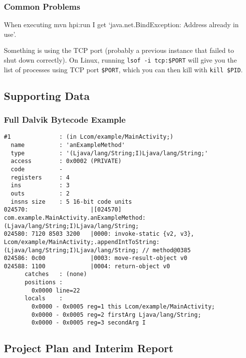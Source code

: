 \subsubsection{Common Problems}

When executing mvn hpi:run I get {\lq}java.net.BindException: Address already in
use{\rq}.

Something is using the TCP port (probably a previous instance that failed to
shut down correctly). On Linux, running {\tt lsof -i tcp:\$PORT} will give you
the list of processes using TCP port {\tt\$PORT}, which you can then kill with
{\tt kill \$PID}.


\subsection{Supporting Data}

\subsubsection{Full Dalvik Bytecode Example}
\label{sec:sec:full_dalvik_bytecode_example}

\begin{lstlisting}
#1              : (in Lcom/example/MainActivity;)
  name          : 'anExampleMethod'
  type          : '(Ljava/lang/String;I)Ljava/lang/String;'
  access        : 0x0002 (PRIVATE)
  code          -
  registers     : 4
  ins           : 3
  outs          : 2
  insns size    : 5 16-bit code units
024570:                  |[024570] com.example.MainActivity.anExampleMethod:(Ljava/lang/String;I)Ljava/lang/String;
024580: 7120 8503 3200   |0000: invoke-static {v2, v3}, Lcom/example/MainActivity;.appendIntToString:(Ljava/lang/String;I)Ljava/lang/String; // method@0385
024586: 0c00             |0003: move-result-object v0
024588: 1100             |0004: return-object v0
      catches   : (none)
      positions :
        0x0000 line=22
      locals    :
        0x0000 - 0x0005 reg=1 this Lcom/example/MainActivity;
        0x0000 - 0x0005 reg=2 firstArg Ljava/lang/String;
        0x0000 - 0x0005 reg=3 secondArg I
\end{lstlisting}

\subsection{Project Plan and Interim Report}




